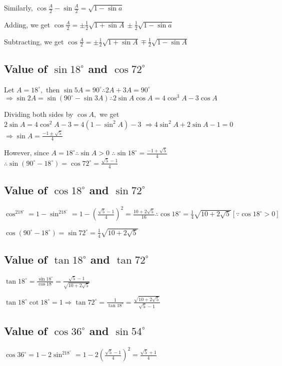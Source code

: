 \noindent Similarly, $\cos \frac{A}{2} - \sin \frac{A}{2} = \sqrt{1 - \sin a}$

\noindent Adding, we get $\cos \frac{A}{2} = \pm\frac{1}{2}\sqrt{1 + \sin A} \pm\frac{1}{2}\sqrt{1 - \sin a}$

\noindent Subtracting, we get $\cos \frac{A}{2} = \pm\frac{1}{2}\sqrt{1 + \sin A} \mp\frac{1}{2}\sqrt{1 - \sin A}$

\subsection{Value of $\sin 18^\circ$ and $\cos 72^\circ$}
Let $A = 18^\circ,$ then $\sin 5A = 90^\circ \therefore 2A + 3A = 90^\circ$ $\Rightarrow \sin2A = \sin(90^\circ - \sin 3A) \therefore 2\sin A\cos A = 4\cos^3A - 3\cos A$

\noindent Dividing both sides by $\cos A,$ we get $2\sin A = 4\cos^2A - 3 = 4(1 - \sin^2A) - 3$ $\Rightarrow 4\sin^2A + 2\sin A - 1 = 0$ $\Rightarrow \sin A = \frac{-1\pm\sqrt{5}}{4}$

\noindent However, since $A= 18^\circ\therefore \sin A > 0$ $\therefore \sin18^\circ = \frac{-1 + \sqrt{5}}{4}$ $\therefore \sin(90^\circ - 18^\circ) = \cos72^\circ = \frac{\sqrt{5} - 1}{4}$

\subsection{Value of $\cos 18^\circ$ and $\sin 72^\circ$}
$\cos^218^\circ = 1 - \sin^218^\circ = 1 - \left(\frac{\sqrt{5} - 1}{4}\right)^2 = \frac{10 + 2\sqrt{5}}{16}\therefore \cos18^\circ = \frac{1}{4}\sqrt{10 + 2\sqrt{5}}[\because \cos18^\circ > 0]$

\noindent $\cos(90^\circ - 18^\circ) = \sin72^\circ = \frac{1}{4}\sqrt{10 + 2\sqrt{5}}$

\subsection{Value of $\tan 18^\circ$ and $\tan 72^\circ$}
$\tan 18^\circ = \frac{\sin18^\circ}{\cos18^\circ} = \frac{\sqrt{5} - 1}{\sqrt{10 + 2\sqrt{5}}}$

\noindent $\tan18^\circ\cot18^\circ = 1\Rightarrow \tan72^\circ = \frac{1}{\tan18^\circ} = \frac{\sqrt{10 + 2\sqrt{5}}}{\sqrt{5} - 1}$

\subsection{Value of $\cos 36^\circ$ and $\sin 54^\circ$}
$\cos 36^\circ = 1 - 2\sin^218^\circ = 1 - 2\left(\frac{\sqrt{5} - 1}{4}\right)^2= \frac{\sqrt{5} + 1}{4}$

